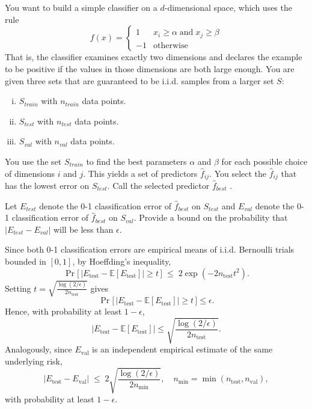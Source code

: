 \documentclass[a4paper]{article}
\begin{document}
\section{}
You want to build a simple classifier on a $d$-dimensional space, which uses the rule
$$f(x) = \left\{ \begin{array}{ll}
        1 & x_i \geq \alpha \; \text{and} \; x_j \geq \beta \\
        -1 & \text{otherwise}
\end{array}\right.$$
That is, the classifier examines exactly two dimensions and declares the example to be positive if the values in those dimensions are both large enough.
You are given three sets that are guaranteed to be i.i.d. samples from a larger set $S$:
\begin{enumerate}[(i)]
    \item $S_\mathit{train}$ with $n_\mathit{train}$ data points.
    \item $S_\mathit{test}$ with $n_\mathit{test}$ data points.
    \item $S_\mathit{val}$ with $n_\mathit{val}$ data points.
\end{enumerate}
You use the set $S_\mathit{train}$ to find the best parameters $\alpha$ and $\beta$ for each possible choice of dimensions $i$ and $j$.
This yields a set of predictors $\hat{f}_{ij}$.
You select the $\hat{f}_{ij}$ that has the lowest error on $S_\mathit{test}$.
Call the selected predictor $\hat{f}_{best}$ .

Let $E_\mathit{test}$ denote the 0-1 classification error of $\hat{f}_{best}$ on $S_\mathit{test}$ and $E_\mathit{val}$ denote the 0-1 classification error of $\hat{f}_{best}$ on $S_\mathit{val}$.
Provide a bound on the probability that $|E_\mathit{test} - E_\mathit{val}|$ will be less than $\epsilon$.


Since both 0-1 classification errors are empirical means of i.i.d. Bernoulli trials bounded in $[0,1]$, by Hoeffding’s inequality,
\[
\Pr\!\big[\,|E_{\mathrm{test}} - \mathbb{E}[E_{\mathrm{test}}]| \ge t\,\big]
\;\le\; 2\exp(-2n_{\mathrm{test}}t^2).
\]
Setting $t = \sqrt{\frac{\log(2/\epsilon)}{2n_{\mathrm{test}}}}$ gives
\[
\Pr\!\big[\,|E_{\mathrm{test}} - \mathbb{E}[E_{\mathrm{test}}]| \ge t\,\big] \le \epsilon.
\]
Hence, with probability at least $1-\epsilon$,
\[
|E_{\mathrm{test}} - \mathbb{E}[E_{\mathrm{test}}]| \le 
\sqrt{\frac{\log(2/\epsilon)}{2n_{\mathrm{test}}}}.
\]
Analogously, since $E_{\mathrm{val}}$ is an independent empirical estimate of the same underlying risk,
\[
\boxed{
|E_{\mathrm{test}} - E_{\mathrm{val}}|
\;\le\;
2\sqrt{\frac{\log(2/\epsilon)}{2n_{\min}}},
\quad n_{\min} = \min(n_{\mathrm{test}}, n_{\mathrm{val}}),
}
\]
with probability at least $1-\epsilon$.
\clearpage
\end{document}
